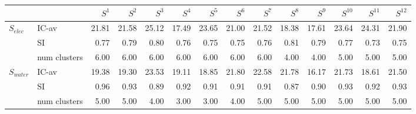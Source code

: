 \begin{tabular}{llrrrrrrrrrrrr}
\toprule
 &  & $S^{1}$ & $S^{2}$ & $S^{3}$ & $S^{4}$ & $S^{5}$ & $S^{6}$ & $S^{7}$ & $S^{8}$ & $S^{9}$ & $S^{10}$ & $S^{11}$ & $S^{12}$ \\
\midrule
\multirow[c]{3}{*}{$S_{elec}$} & IC-av & 21.81 & 21.58 & 25.12 & 17.49 & 23.65 & 21.00 & 21.52 & 18.38 & 17.61 & 23.64 & 24.31 & 21.90 \\
 & SI & 0.77 & 0.79 & 0.80 & 0.76 & 0.75 & 0.75 & 0.76 & 0.81 & 0.79 & 0.77 & 0.73 & 0.75 \\
 & num clusters & 6.00 & 6.00 & 6.00 & 6.00 & 6.00 & 6.00 & 6.00 & 4.00 & 4.00 & 5.00 & 5.00 & 5.00 \\
\multirow[c]{3}{*}{$S_{water}$} & IC-av & 19.38 & 19.30 & 23.53 & 19.11 & 18.85 & 21.80 & 22.58 & 21.78 & 16.17 & 21.73 & 18.61 & 21.50 \\
 & SI & 0.96 & 0.93 & 0.89 & 0.92 & 0.91 & 0.91 & 0.91 & 0.87 & 0.90 & 0.93 & 0.92 & 0.93 \\
 & num clusters & 5.00 & 5.00 & 4.00 & 3.00 & 3.00 & 4.00 & 5.00 & 5.00 & 5.00 & 5.00 & 5.00 & 5.00 \\
\bottomrule
\end{tabular}
